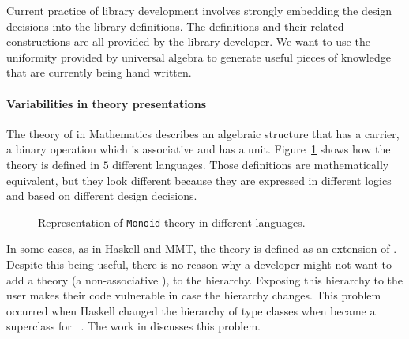 Current practice of library development involves strongly embedding the design decisions into the library definitions. The definitions and their related constructions are all provided by the library developer. We want to use the uniformity provided by universal algebra to generate useful pieces of knowledge that are currently being hand written. 


\paragraph{Variabilities in theory presentations}
The theory of  in Mathematics describes an algebraic structure that has a carrier, a binary operation which is associative and has a unit. 
Figure~\ref{fig:mon-diff-lang} shows how the  theory is defined in $5$ different languages. Those definitions are mathematically equivalent, but they look different because they are expressed in different logics and based on different design decisions. 
\begin{figure}
    
    \caption{Representation of \lstinline|Monoid| theory in different languages.}
    \label{fig:mon-diff-lang}
\end{figure}

In some cases, as in Haskell and MMT, the theory \monoid is defined as an extension of \semigroup. Despite this being useful, there is no reason why a developer might not want to add a theory \unital (a non-associative \monoid), to the hierarchy. Exposing this hierarchy to the user makes their code vulnerable in case the hierarchy changes. This problem occurred when Haskell changed the hierarchy of type classes when  became a superclass for  ~\cite{wiki:haskell_hierarch}. The work in \cite{cohen2020hierarchy} discusses this problem. 

